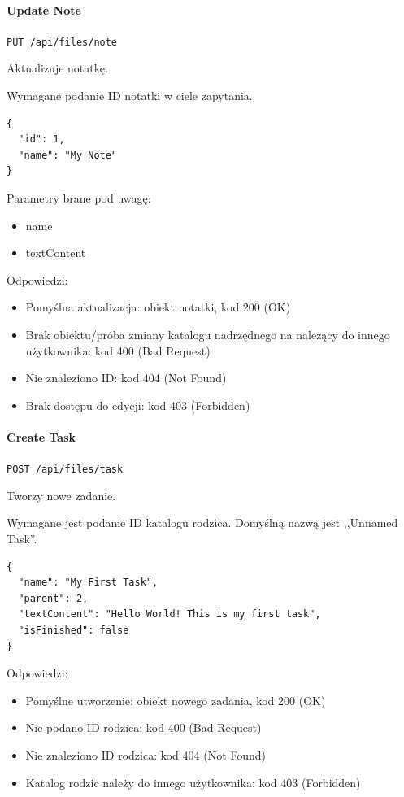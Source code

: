 \documentclass[a4paper,twoside,12pt]{book}
\begin{document}
\paragraph{Update Note}\label{update-note}

\texttt{PUT /api/files/note}

Aktualizuje notatkę.

Wymagane podanie ID notatki w ciele zapytania.

\begin{verbatim}
{
  "id": 1,
  "name": "My Note"
}
\end{verbatim}

Parametry brane pod uwagę: 
\begin{itemize}
	\item  name \item  textContent
\end{itemize}

Odpowiedzi: 
\begin{itemize}
	\item Pomyślna aktualizacja: obiekt notatki, kod 200 (OK) 
	\item Brak obiektu/próba zmiany katalogu nadrzędnego na należący do innego użytkownika: kod 400 (Bad Request) 
	\item Nie znaleziono ID: kod 404 (Not Found)
	\item Brak dostępu do edycji: kod 403 (Forbidden)
\end{itemize}

\paragraph{Create Task}\label{create-task}

\texttt{POST /api/files/task}

Tworzy nowe zadanie.

Wymagane jest podanie ID katalogu rodzica. Domyślną nazwą jest ,,Unnamed Task''.

\begin{verbatim}
{
  "name": "My First Task",
  "parent": 2,
  "textContent": "Hello World! This is my first task",
  "isFinished": false
}
\end{verbatim}

Odpowiedzi: 
\begin{itemize}
	\item Pomyślne utworzenie: obiekt nowego zadania, kod 200 (OK) 
	\item Nie podano ID rodzica: kod 400 (Bad Request)
	\item Nie znaleziono ID rodzica: kod 404 (Not Found) 
	\item Katalog rodzic należy do innego użytkownika: kod 403 (Forbidden)
\end{itemize}
\end{document}

